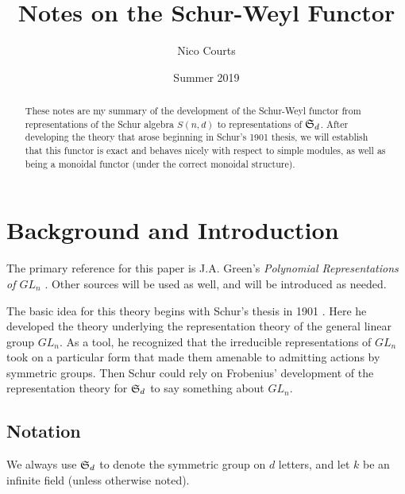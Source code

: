 \documentclass[12pt]{article}
\DeclareMathOperator{\1}{\mathbbm{1}}
\begin{document}
\title{Notes on the Schur-Weyl Functor \vspace{-1ex}}
\author{Nico Courts}
\date{Summer 2019}
\maketitle

\begin{abstract}
	These notes are my summary of the development of the Schur-Weyl functor from representations of the Schur algebra $S(n,d)$ to 
	representations of $\mathfrak{S}_d$. After developing the theory that arose beginning in Schur's 1901 thesis, we will establish that this 
	functor is exact and behaves nicely with respect to simple modules, as well as being a monoidal functor (under the correct monoidal structure).
\end{abstract}

\section{Background and Introduction}
The primary reference for this paper is J.A. Green's \textit{Polynomial Representations of $GL_n$} \cite{green}. Other sources will be used as well, 
and will be introduced as needed.

The basic idea for this theory begins with Schur's thesis in 1901 \cite{schur-thesis}. Here he developed the theory underlying
the representation theory of the general linear group $GL_n$. As a tool, he recognized that the irreducible representations of 
$GL_n$ took on a particular form that made them amenable to admitting actions by symmetric groups. Then Schur could rely on 
Frobenius' development of the representation theory for $\mathfrak{S}_d$ to say something about $GL_n$.

\subsection{Notation}
We always use $\mathfrak{S}_d$ to denote the symmetric group on $d$ letters, and let $k$ be an infinite field (unless otherwise noted).
\end{document}
